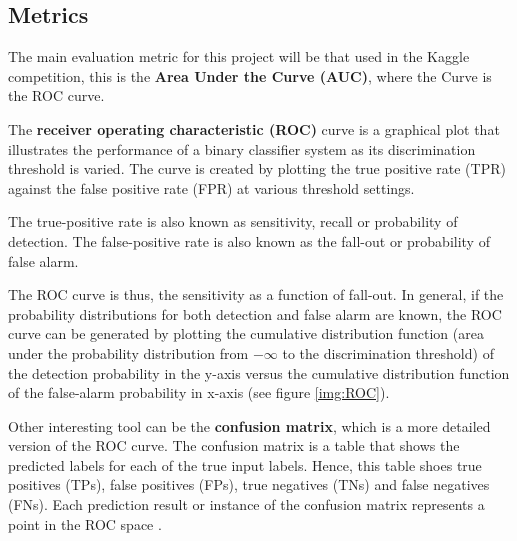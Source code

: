\documentclass[]{article}
\begin{document}
\subsection{Metrics}\label{metrics}

The main evaluation metric for this project will be that used in the Kaggle competition, this is the \textbf{Area Under the Curve (AUC)}, where the Curve is the ROC curve.

The \textbf{receiver operating characteristic (ROC)} curve is a graphical plot that illustrates the performance of a binary classifier system as its discrimination threshold is varied. The curve is created by plotting the true positive rate (TPR) against the false positive rate (FPR) at various threshold settings.

The true-positive rate is also known as sensitivity, recall or probability of detection. The false-positive rate is also known as the fall-out or probability of false alarm. 

The ROC curve is thus, the sensitivity as a function of fall-out. In general, if the probability distributions for both detection and false alarm are known, the ROC curve can be generated by plotting the cumulative distribution function (area under the probability distribution from $-\infty$  to the discrimination threshold) of the detection probability in the y-axis versus the cumulative distribution function of the false-alarm probability in x-axis (see figure \ref{img:ROC})\cite{wikiROC}. 

Other interesting tool can be the \textbf{confusion matrix}, which is a more detailed version of the ROC curve. The confusion matrix is a table that shows the predicted labels for each of the true input labels. Hence, this table shoes true positives (TPs), false positives (FPs), true negatives (TNs) and false negatives (FNs). Each prediction result or instance of the confusion matrix represents a point in the ROC space \cite{wikiROC}.
\end{document}
